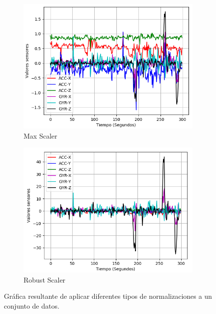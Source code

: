\begin{figure}
{\begin{varwidth}{\textwidth}
        \begin{subfigure}[h]{0.45\textwidth} 
            \includegraphics[width=\textwidth]{imagenes/Cap3/datos_max_scaler}
            \caption{Max Scaler}
            \label{fig:max}
        \end{subfigure}       
        \begin{subfigure}[h]{0.45\textwidth} 
            \includegraphics[width=\textwidth]{imagenes/Cap3/datos_robust_scaler}
            \caption{Robust Scaler}
            \label{fig:robust}
        \end{subfigure}
        \end{varwidth}}
        \caption{Gr\'{a}fica resultante de aplicar diferentes tipos de normalizaciones a un conjunto de datos.}
        
		\label{fig:nor_nor}
    \end{figure}

